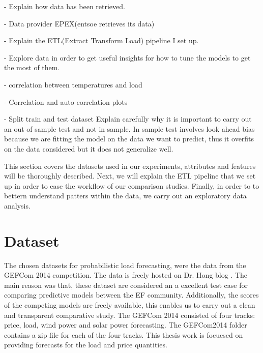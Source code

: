 - Explain how data has been retrieved.

- Data provider EPEX(entsoe retrieves its data)

- Explain the ETL(Extract Transform Load) pipeline
I set up.

- Explore data in order to get useful insights for
how to tune the models to get the most of them.

- correlation between temperatures and load

- Correlation and auto correlation plots

- Split train and test dataset
Explain carefully why it is important to carry
out an out of sample test and not in sample.
In sample test involves look ahead bias because we are
fitting the model on the data we want to predict,
thus it overfits on the data considered but it does
not generalize well.


This section covers the datasets used in our experiments, attributes and features will be thoroughly described.
Next, we will explain the ETL pipeline that we set up in order to ease the workflow of our comparison studies.
Finally, in order to to bettern understand patters within the data, we carry out an exploratory data analysis.

\section{Dataset}
The chosen datasets for probabilistic load forecasting, were the data from the GEFCom 2014 competition. The data is freely hosted on Dr. Hong blog \cite{hong2016probabilistic}.
The main reason was that, these dataset are considered an a excellent test case for comparing predictive models between the EF community. Additionally, the scores of the competing models are freely available, this enables us to carry out a clean and transparent comparative study.
The GEFCom 2014 consisted of four tracks: price, load, wind power and solar power forecasting. 
The GEFCom2014 folder contains a zip file for each of the four tracks.
This thesis work is focuesed on providing forecasts for the load and price quantities.
\\
